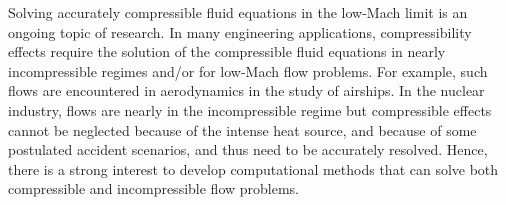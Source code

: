 \documentclass[review,10pt]{elsarticle}
\begin{document}

Solving accurately compressible fluid equations in the low-Mach limit is an ongoing topic of research. 
In many engineering applications, compressibility effects require the solution of the compressible fluid equations
in nearly incompressible regimes and/or for low-Mach flow problems. For example, such flows are encountered 
in aerodynamics in the study of airships. In the nuclear industry, flows are nearly in the incompressible regime but 
compressible effects cannot be neglected because of the intense heat source, and because of some postulated accident scenarios, 
and thus need to be accurately resolved. Hence, there is a strong interest to develop computational methods 
that can solve both compressible and incompressible flow problems.  
\end{document}
